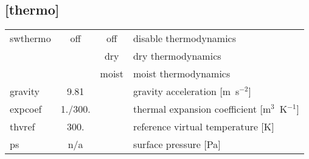 \documentclass[a4paper,10pt]{extarticle}
\begin{document}
\subsection*{[thermo]}
\tablelasttail{\hline}
\begin{supertabular}{lccl}
swthermo      & off       & off   & disable thermodynamics \\
              &           & dry   & dry thermodynamics \\
              &           & moist & moist thermodynamics \\
gravity       & 9.81      &       & gravity acceleration [m~s$^{-2}$] \\
expcoef       & 1./300.   &       & thermal expansion coefficient [m$^3$~K$^{-1}$] \\
thvref        & 300.      &       & reference virtual temperature [K] \\
ps            & n/a       &       & surface pressure [Pa] \\
\end{supertabular}
\end{document}
